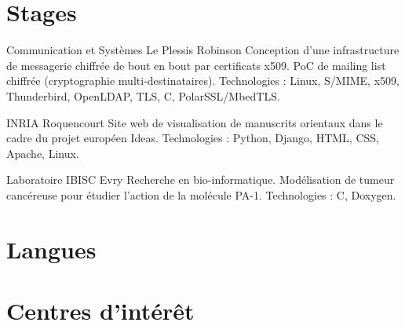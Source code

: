 \documentclass[10pt,a4paper,sans]{moderncv}
\begin{document}
\section{Stages}
        {Communication et Systèmes}
        {Le Plessis Robinson}
        {}
        {Conception d'une infrastructure de messagerie chiffrée de bout en bout par certificats x509. PoC de mailing list chiffrée (cryptographie multi-destinataires). Technologies : Linux, S/MIME, x509, Thunderbird, OpenLDAP, TLS, C, PolarSSL/MbedTLS.}

        {INRIA}
        {Roquencourt}
        {}
        {Site web de visualisation de manuscrits orientaux dans le cadre du projet européen Ideas. Technologies : Python, Django, HTML, CSS, Apache, Linux.}

        {Laboratoire IBISC}
        {Evry}
        {}
        {Recherche en bio-informatique. Modélisation de tumeur cancéreuse pour étudier l'action de la molécule PA-1. Technologies : C, Doxygen.}

\section{Langues}

\section{Centres d'intérêt}
\end{document}

